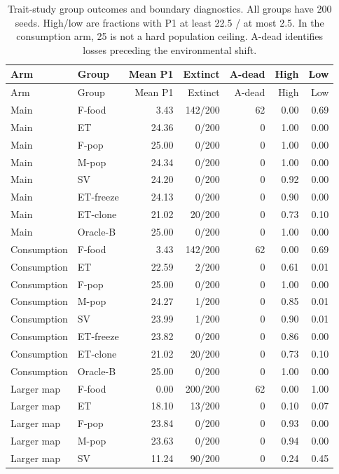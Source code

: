 {\small
\begin{longtable}{llrrrrr}
\caption{Trait-study group outcomes and boundary diagnostics. All groups have 200 seeds. High/low are fractions with P1 at least 22.5 / at most 2.5. In the consumption arm, 25 is not a hard population ceiling. A-dead identifies losses preceding the environmental shift.}\label{tab:traitgroups}\\
\toprule
Arm & Group & Mean P1 & Extinct & A-dead & High & Low\\\midrule
\endfirsthead
\toprule
Arm & Group & Mean P1 & Extinct & A-dead & High & Low\\\midrule
\endhead
\bottomrule\endfoot
Main & F-food & 3.43 & 142/200 & 62 & 0.00 & 0.69\\
Main & ET & 24.36 & 0/200 & 0 & 1.00 & 0.00\\
Main & F-pop & 25.00 & 0/200 & 0 & 1.00 & 0.00\\
Main & M-pop & 24.34 & 0/200 & 0 & 1.00 & 0.00\\
Main & SV & 24.20 & 0/200 & 0 & 0.92 & 0.00\\
Main & ET-freeze & 24.13 & 0/200 & 0 & 0.90 & 0.00\\
Main & ET-clone & 21.02 & 20/200 & 0 & 0.73 & 0.10\\
Main & Oracle-B & 25.00 & 0/200 & 0 & 1.00 & 0.00\\
Consumption & F-food & 3.43 & 142/200 & 62 & 0.00 & 0.69\\
Consumption & ET & 22.59 & 2/200 & 0 & 0.61 & 0.01\\
Consumption & F-pop & 25.00 & 0/200 & 0 & 1.00 & 0.00\\
Consumption & M-pop & 24.27 & 1/200 & 0 & 0.85 & 0.01\\
Consumption & SV & 23.99 & 1/200 & 0 & 0.90 & 0.01\\
Consumption & ET-freeze & 23.82 & 0/200 & 0 & 0.86 & 0.00\\
Consumption & ET-clone & 21.02 & 20/200 & 0 & 0.73 & 0.10\\
Consumption & Oracle-B & 25.00 & 0/200 & 0 & 1.00 & 0.00\\
Larger map & F-food & 0.00 & 200/200 & 62 & 0.00 & 1.00\\
Larger map & ET & 18.10 & 13/200 & 0 & 0.10 & 0.07\\
Larger map & F-pop & 23.84 & 0/200 & 0 & 0.93 & 0.00\\
Larger map & M-pop & 23.63 & 0/200 & 0 & 0.94 & 0.00\\
Larger map & SV & 11.24 & 90/200 & 0 & 0.24 & 0.45\\

\end{longtable}}
